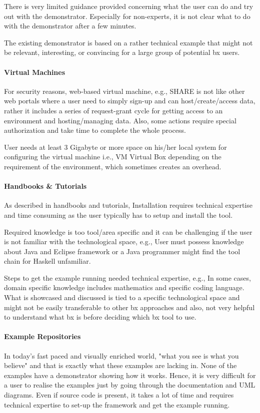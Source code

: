 There is very limited guidance provided concerning what the user can do and try out with the demonstrator. Especially for non-experts, it is not clear what to do with the demonstrator after a few minutes.

The existing demonstrator is based on a rather technical example that might not be relevant, interesting, or convincing for a large group of potential bx users.

\paragraph{Virtual Machines}
For security reasons, web-based virtual machine, e.g., SHARE is not like other web portals where a user need to simply sign-up and can host/create/access data, rather it includes a series of request-grant cycle for getting access to an environment and hosting/managing data. Also, some actions require special authorization and take time to complete the whole process.

User needs at least 3 Gigabyte or more space on his/her local system for configuring the virtual machine i.e., VM Virtual Box depending on the requirement of the environment, which sometimes creates an overhead.

\paragraph{Handbooks \& Tutorials}
As described in handbooks and tutorials, Installation requires technical expertise and time consuming as the user typically has to setup and install the tool.

Required knowledge is too tool/area specific and it can be challenging if the user is not familiar with the technological space, e.g., User must possess knowledge about Java and Eclipse framework or a Java programmer might find the tool chain for Haskell unfamiliar.

Steps to get the example running needed technical expertise, e.g., In some cases, domain specific knowledge includes mathematics and specific coding language. What is showcased and discussed is tied to a specific technological space and might not be easily transferable to other bx approaches and also, not very helpful to understand what bx is before deciding which bx tool to use.

\paragraph{Example Repositories}
In today's fast paced and visually enriched world, "what you see is what you believe" and that
is exactly what these examples are lacking in. None of the examples have a demonstrator
showing how it works. Hence, it is very difficult for a user to realise the examples just by going
through the documentation and UML diagrams. Even if source code is present, it takes a lot
of time and requires technical expertise to set-up the framework and get the example running.

